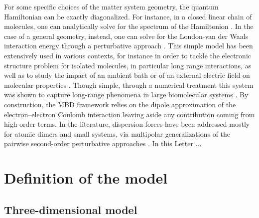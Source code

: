 \documentclass[reprint, amsmath, amssymb, aps]{revtex4-2}
\begin{document}
    For some specific choices of the matter system geometry, the quantum Hamiltonian can be exactly diagonalized. For instance, in a closed linear chain of molecules, one can analytically solve for the spectrum of the Hamiltonion \cite{doi:10.1063/1.1743992}. In the case of a general geometry, instead, one can solve for the London-van der Waals interaction energy through a perturbative approach \cite{doi:10.1063/1.1743991}.
    This simple model has been extensively used in various contexts, for instance in order to tackle the electronic structure problem for isolated molecules, in particular long range interactions, as well as to study the impact of an ambient bath or of an external electric field on molecular properties \cite{Karimpour_2022, karimpour2021comprehensive}.
    Though simple, through a numerical treatment this system was shown to capture long-range phenomena in large biomolecular systems \cite{https://doi.org/10.48550/arxiv.2205.11549}. By construction, the MBD framework relies on the dipole approximation of the electron–electron Coulomb interaction leaving aside any contribution coming from high-order terms. In the literature, dispersion forces have been addressed mostly for atomic dimers and small systems, via multipolar generalizations of the pairwise second-order perturbative approaches \cite{massa2021beyond,massa2021many,becke2006simple,becke2006exchange}.
    In this Letter ...


\section{Definition of the model}

    \subsection{Three-dimensional model}
\end{document}
